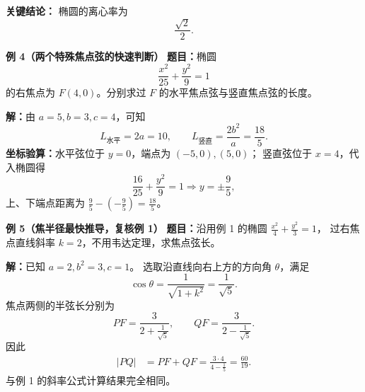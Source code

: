 \begin{examplebox}
	\textbf{\textcolor{CExample}{关键结论：}}
	椭圆的离心率为
	\[
		\boxed{\frac{\sqrt2}{2}}.
	\]


    \medskip

    \textbf{\textcolor{CExample}{例 4（两个特殊焦点弦的快速判断）}}
    \textbf{题目：}椭圆
    \[
        \frac{x^2}{25}+\frac{y^2}{9}=1
    \]
    的右焦点为 $F(4,0)$。分别求过 $F$ 的水平焦点弦与竖直焦点弦的长度。

    \textbf{解：}由 $a=5,b=3,c=4$，可知
    \[
        \boxed{L_{\text{水平}}=2a=10},\qquad
        \boxed{L_{\text{竖直}}=\frac{2b^2}{a}=\frac{18}{5}}.
    \]
    \textbf{坐标验算：}水平弦位于 $y=0$，端点为 $(-5,0),(5,0)$；
    竖直弦位于 $x=4$，代入椭圆得
    \[
        \frac{16}{25}+\frac{y^2}{9}=1
        \Longrightarrow y=\pm\frac95,
    \]
    上、下端点距离为 $\frac95-(-\frac95)=\frac{18}{5}$。

    \medskip

    \textbf{\textcolor{CExample}{例 5（焦半径最快推导，复核例 1）}}
    \textbf{题目：}沿用例 1 的椭圆 $\frac{x^2}{4}+\frac{y^2}{3}=1$，
    过右焦点直线斜率 $k=2$，不用韦达定理，求焦点弦长。

    \textbf{解：}已知 $a=2,b^2=3,c=1$。
    选取沿直线向右上方的方向角 $\theta$，满足
    \[
        \cos\theta=\frac1{\sqrt{1+k^2}}=\frac1{\sqrt5}.
    \]
    焦点两侧的半弦长分别为
    \[
        PF=\frac3{2+\frac1{\sqrt5}},\qquad
        QF=\frac3{2-\frac1{\sqrt5}}.
    \]
    因此
    \[
        \begin{aligned}
        |PQ|&=PF+QF
        =\frac{3\cdot4}{4-\frac15}
        =\boxed{\frac{60}{19}}.
        \end{aligned}
    \]
    与例 1 的斜率公式计算结果完全相同。

\end{examplebox}